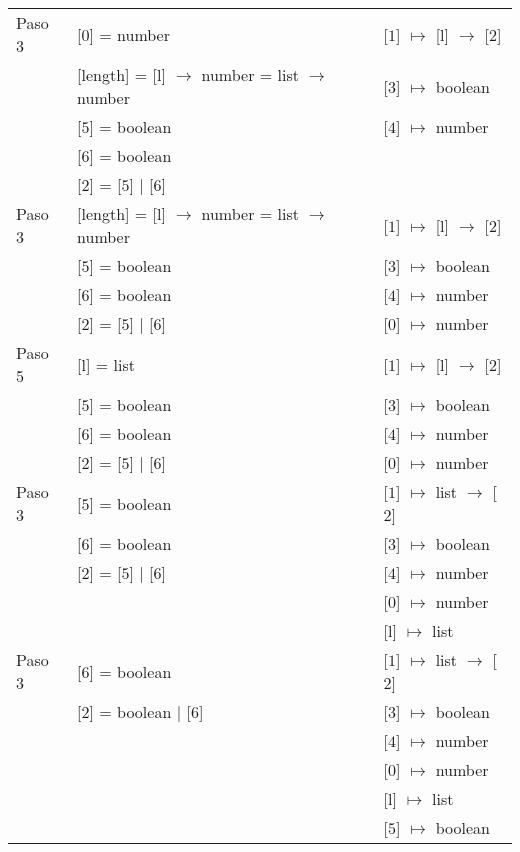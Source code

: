 \documentclass{article}
\begin{document}
\begin{center}
\begin{longtable}{ | l | p{10 cm} | p{5 cm} | }
 Paso 3 & [0] = number									& [$\boxed{1}$] $\mapsto$ [l] $\rightarrow$ [$\boxed{2}$] \\ 
	& [length] = [l] $\rightarrow$ number =
	  list $\rightarrow$ number							& [$\boxed{3}$] $\mapsto$ boolean \\
	& [$\boxed{5}$] = boolean							& [$\boxed{4}$] $\mapsto$ number \\
	& [$\boxed{6}$] = boolean							&	\\
	& [$\boxed{2}$] = [$\boxed{5}$] $|$ [$\boxed{6}$]				&	\\ \hline

 Paso 3 & [length] = [l] $\rightarrow$ number =
	  list $\rightarrow$ number							& [$\boxed{1}$] $\mapsto$ [l] $\rightarrow$ [$\boxed{2}$] \\
	& [$\boxed{5}$] = boolean							& [$\boxed{3}$] $\mapsto$ boolean \\
	& [$\boxed{6}$] = boolean							& [$\boxed{4}$] $\mapsto$ number \\
	& [$\boxed{2}$] = [$\boxed{5}$] $|$ [$\boxed{6}$]				& [0] $\mapsto$ number \\ \hline

 Paso 5 & [l] = list									& [$\boxed{1}$] $\mapsto$ [l] $\rightarrow$ [$\boxed{2}$] \\
	& [$\boxed{5}$] = boolean							& [$\boxed{3}$] $\mapsto$ boolean \\
	& [$\boxed{6}$] = boolean							& [$\boxed{4}$] $\mapsto$ number \\
	& [$\boxed{2}$] = [$\boxed{5}$] $|$ [$\boxed{6}$]				& [0] $\mapsto$ number \\ \hline

 Paso 3 & [$\boxed{5}$] = boolean							& [$\boxed{1}$] $\mapsto$ list $\rightarrow$ [$\boxed{2}$] \\
	& [$\boxed{6}$] = boolean							& [$\boxed{3}$] $\mapsto$ boolean \\
	& [$\boxed{2}$] = [$\boxed{5}$] $|$ [$\boxed{6}$]				& [$\boxed{4}$] $\mapsto$ number \\
	&	& [0] $\mapsto$ number \\
	&	& [l] $\mapsto$ list \\ \hline
 
 Paso 3 & [$\boxed{6}$] = boolean						& [$\boxed{1}$] $\mapsto$ list $\rightarrow$ [$\boxed{2}$] \\
	& [$\boxed{2}$] = boolean $|$ [$\boxed{6}$]				& [$\boxed{3}$] $\mapsto$ boolean \\
	&	& [$\boxed{4}$] $\mapsto$ number \\
	&	& [0] $\mapsto$ number \\ 
	&	& [l] $\mapsto$ list \\
	&	& [$\boxed{5}$] $\mapsto$ boolean \\ \hline
 

\end{longtable}
\end{center}
\end{document}
